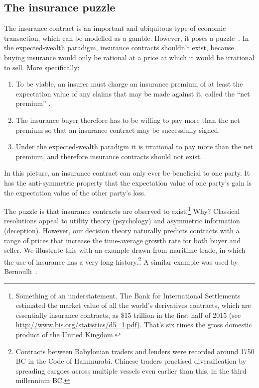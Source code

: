 \subsection{The insurance puzzle}
The insurance contract is an important and ubiquitous type of economic transaction, 
which can be modelled as a gamble. However, it poses a 
puzzle~\cite{PetersAdamou2015b}. In the expected-wealth paradigm, insurance 
contracts shouldn't exist, because buying insurance would only be rational at a 
price at which it would be irrational to sell. More specifically:
\begin{enumerate}
\item To be viable, an insurer must charge an insurance premium of at least the 
expectation value of any claims that may be made against it, called the ``net 
premium'' \cite[p.~1]{KaasETAL2008}.
\item The insurance buyer therefore has to be willing to pay more than the net 
premium so that an insurance contract may be successfully signed.
\item Under the expected-wealth paradigm it is irrational to pay more than the 
net premium, and therefore insurance contracts should not exist.
\end{enumerate}
In this picture, an insurance contract can only ever be beneficial to one party. It 
has the anti-symmetric property that the expectation value of one party's gain is 
the expectation value of the other party's loss.

The puzzle is that insurance contracts are observed to exist.\footnote{Something 
of an understatement. The Bank for International Settlements estimated the 
market value of all the world's derivatives contracts, which are essentially 
insurance contracts, as \$15 trillion in the first half of 2015 (see 
\url{http://www.bis.org/statistics/d5\_1.pdf}). That's six times the gross domestic 
product of the United Kingdom.} Why? Classical resolutions appeal to utility 
theory (\ie psychology) and asymmetric information (\ie deception). However, 
our decision theory naturally predicts contracts with a range of prices that 
increase the time-average growth rate for both buyer and seller. We illustrate 
this with an example drawn from maritime trade, in which the use of insurance 
has a very long history.\footnote{Contracts between Babylonian traders and 
lenders were recorded around 1750 BC in the Code of Hammurabi. Chinese 
traders practised diversification by spreading cargoes across multiple vessels 
even earlier than this, in the third millennium BC.} A similar 
example was used by Bernoulli~\cite{Bernoulli1738}.

